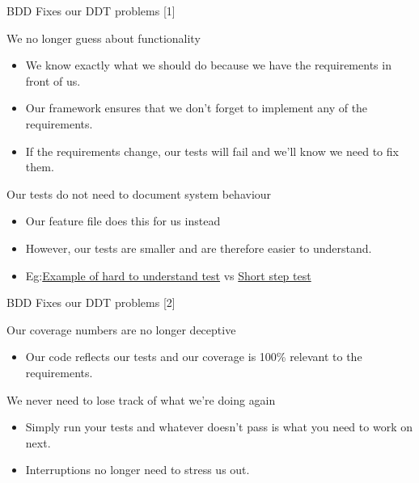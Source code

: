 \documentclass[bigger]{beamer}
\begin{document}
\begin{frame}[label={sec:orgff1f235}]{BDD Fixes our DDT problems [1]}
\begin{block}{We \alert{no longer} guess about functionality}
\begin{itemize}
\item We know exactly what we should do because we have the requirements in front of us.
\item Our framework ensures that we don't forget to implement any of the requirements.
\item If the requirements change, our tests will fail and we'll know we need to fix them.
\end{itemize}
\end{block}
\begin{block}{Our tests \alert{do not need to} document system behaviour}
\begin{itemize}
\item Our feature file does this for us instead
\item However, our tests are smaller and are therefore easier to understand.
\item Eg:\href{file:///Users/rogergordon/ownCloud/Documents/Career/Design\_Development/Clients/Tangent\_Solutions/Vumatel/orderfulfilmentservice/orders/ae/tests/test\_order.py}{Example of hard to understand test} vs \href{possible\_solution/tests.py}{Short step test}
\end{itemize}
\end{block}
\end{frame}
\begin{frame}[label={sec:orgf20f18f}]{BDD Fixes our DDT problems [2]}
\begin{block}{Our coverage numbers are \alert{no longer} deceptive}
\begin{itemize}
\item Our code reflects our tests and our coverage is 100\% relevant to the requirements.
\end{itemize}
\end{block}
\begin{block}{We \alert{never need to} lose track of what we're doing \alert{again}}
\begin{itemize}
\item Simply run your tests and whatever doesn't pass is what you need to work on next.
\item Interruptions no longer need to stress us out.
\end{itemize}
\end{block}
\end{frame}
\end{document}
